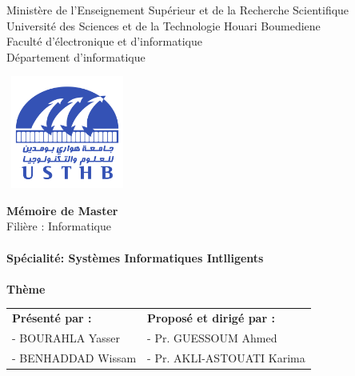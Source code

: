 \documentclass[12pt , a4paper]{report}
\begin{document}
	\begin{center}
		\normalsize{Ministère de l'Enseignement Supérieur et de la Recherche Scientifique}\\
		\normalsize{Université des Sciences et de la Technologie Houari Boumediene}\\
		\normalsize{Faculté d'électronique et d'informatique}\\
		\normalsize{Département d'informatique}\\
	\end{center}
	\begin{center}
		\includegraphics[width=4cm,height=3.7cm]{usthb.png}
	\end{center}
	
	
	\begin{center}
		\Huge{\textbf{Mémoire de Master}}\\
		\large{Filière : Informatique}\\
		\textbf{}\\
		\large{\textbf{Spécialité: Systèmes Informatiques Intlligents}}\\
		\textbf{}\\
		\bigskip
		\vspace*{1cm}
		\normalsize{\textbf{Thème}}
	\end{center}
	\vspace*{1.5cm}
	
	\begin{table}[h]
		\center
		\begin{tabular}{p{8cm}p{6.5cm}}
			\textbf{Présenté par :} & \textbf{Proposé et dirigé par :}\\
			- BOURAHLA Yasser  & -	Pr. GUESSOUM Ahmed\\
			- BENHADDAD Wissam & -	Pr. AKLI-ASTOUATI Karima\\
		\end{tabular}
	\end{table}
	
\end{document}
